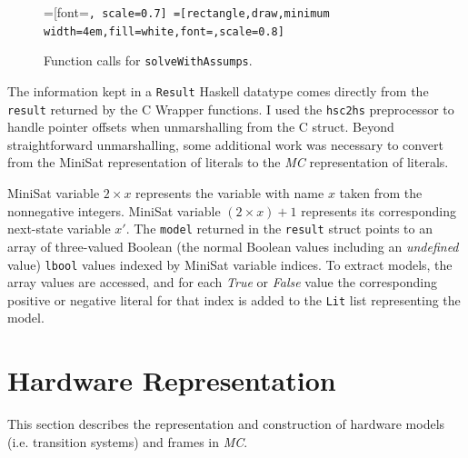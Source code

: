 \documentclass[12pt,a4paper,twoside,openright]{report}
\begin{document}
{{\begin{figure}[t]
\centering
{}=[font=\small\tt, scale=0.7]
=[rectangle,draw,minimum width=4em,fill=white,font=\small\tt,scale=0.8]
\caption{Function calls for {\tt solveWithAssumps}.}
\label{solveWithAssumps}
\end{figure}

The information kept in a \verb,Result, Haskell datatype comes directly from the
\verb,result, returned by the C Wrapper functions.
I used the \verb,hsc2hs, preprocessor to handle pointer offsets
when unmarshalling from the C struct.
Beyond straightforward unmarshalling, some additional work was necessary
to convert from the MiniSat representation of literals to the \emph{MC} representation of
literals.

MiniSat variable $2 \times x$ represents the variable with name $x$ taken from the nonnegative
integers. MiniSat variable $(2 \times x) + 1$ represents its corresponding next-state variable
$x'$.
The \verb,model, returned in the \verb,result, struct
points to an array of three-valued Boolean (the normal Boolean values including an
\emph{undefined} value) \verb,lbool, values indexed by MiniSat variable indices.
To extract models, the array values are accessed, and for each \emph{True} or \emph{False}
value the corresponding positive or negative literal for that index is added to the
\verb,Lit, list representing the model.

\section{Hardware Representation}
\label{impl:representation}
This section describes the representation and construction of hardware models (i.e.
transition systems) and frames in \emph{MC}.
}}
\end{document}
